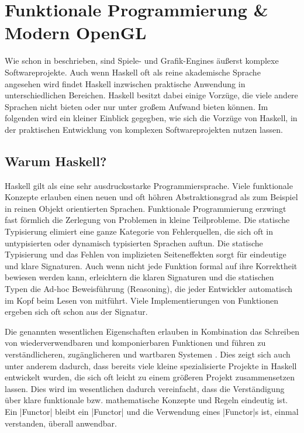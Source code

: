 \chapter{Funktionale Programmierung \& Modern OpenGL}
\label{chap:haskell-modern-gl}

Wie schon in  beschrieben, sind Spiele- und Grafik-Engines äußerst komplexe Softwareprojekte. Auch wenn Haskell oft als reine akademische Sprache angesehen wird findet Haskell inzwischen praktische Anwendung in unterschiedlichen Bereichen. Haskell besitzt dabei einige Vorzüge, die viele andere Sprachen nicht bieten oder nur unter großem Aufwand bieten können. Im folgenden wird ein kleiner Einblick gegegben, wie sich die Vorzüge von Haskell, in der praktischen Entwicklung von komplexen Softwareprojekten nutzen lassen.

\section{Warum Haskell?}
Haskell gilt als eine sehr ausdrucksstarke Programmiersprache. Viele funktionale Konzepte erlauben einen neuen und oft höhren Abstraktionsgrad als zum Beispiel in reinen Objekt orientierten Sprachen. Funktionale Programmierung erzwingt fast förmlich die Zerlegung von Problemen in kleine Teilprobleme. Die statische Typisierung elimiert eine ganze Kategorie von Fehlerquellen, die sich oft in untypisierten oder dynamisch typisierten Sprachen auftun. Die statische Typisierung und das Fehlen von implizieten Seiteneffekten sorgt für eindeutige und klare Signaturen. Auch wenn nicht jede Funktion formal auf ihre Korrektheit bewiesen werden kann, erleichtern die klaren Signaturen und die statischen Typen die Ad-hoc Beweisführung (Reasoning), die jeder Entwickler automatisch im Kopf beim Lesen von mitführt. Viele Implementierungen von Funktionen ergeben sich oft schon aus der Signatur.

Die genannten wesentlichen Eigenschaften erlauben in Kombination das Schreiben von wiederverwendbaren und komponierbaren Funktionen und führen zu verständlicheren, zugänglicheren und wartbaren Systemen \parencite[Seite 12 ff.]{Stewart2015}. Dies zeigt sich auch unter anderem dadurch, dass bereits viele kleine spezialisierte Projekte in Haskell entwickelt wurden, die sich oft leicht zu einem größeren Projekt zusammensetzen lassen. Dies wird im wesentlichen dadurch vereinfacht, dass die Verständigung über klare funktionale bzw. mathematische Konzepte und Regeln eindeutig ist. Ein |Functor| bleibt ein |Functor| und die Verwendung eines |Functor|s ist, einmal verstanden, überall anwendbar.
\cite{Sweeney2006} %

